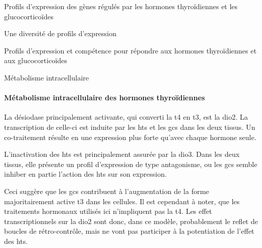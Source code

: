 \documentclass[../main.tex]{subfiles}
\begin{document}
\begin{chapter}{Profils d'expression des gènes régulés par les hormones thyroïdiennes et les glucocorticoïdes}
\begin{section}{Une diversité de profils d'expression}
\begin{subsection}{Profils d'expression et compétence pour répondre aux hormones thyroïdiennes et aux glucocorticoïdes}
\begin{subsubsection}{Métabolisme intracellulaire}
\paragraph{Métabolisme intracellulaire des hormones thyroïdiennes}
La désiodase principalement activante, qui converti la \gls{t4} en \gls{t3}, est la \gls{dio2}.
La transcription de celle-ci est induite par les \glspl{ht} et les \glspl{gc} dans les deux tissus.
Un co-traitement résulte en une expression plus forte qu'avec chaque hormone seule.
\par
L'inactivation des \glspl{ht} est principalement assurée par la \gls{dio3}.
Dans les deux tissus, elle présente un profil d'expression de type antagonisme, ou les \glspl{gc} semble inhiber en partie l'action des \glspl{ht} sur son expression.
\par
Ceci suggère que les \glspl{gc} contribuent à l'augmentation de la forme majoritairement active \gls{t3} dans les cellules.
Il est cependant à noter, que les traitements hormonaux utilisés ici n'impliquent pas la \gls{t4}.
Les effet transcriptionnels sur la \gls{dio2} sont donc, dans ce modèle, probablement le reflet de boucles de rétro-contrôle, mais ne vont pas participer à la potentiation de l'effet des \glspl{ht}.


\end{subsubsection}
\end{subsection}
\end{section}
\end{chapter}
\end{document}
